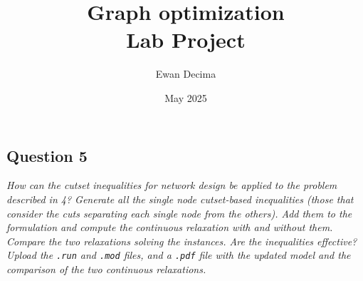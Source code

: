 \documentclass[10pt]{article}
\begin{document}
	\title{Graph optimization \\ Lab Project}
	\author{Ewan Decima}
	\date{May 2025}

	\maketitle

	\tableofcontents
	\newpage

	
	\newpage

	
	\newpage

	
	\newpage

	
	\newpage


    \subsection*{Question 5}
    \textit{How can the cutset inequalities for network design be applied to the problem described in 4? Generate all the single node cutset-based inequalities (those that consider the cuts separating each single node from the others). Add them to the formulation and compute the continuous relaxation with and without them. Compare the two relaxations solving the instances. Are the inequalities effective? Upload the \texttt{.run} and \texttt{.mod} files, and a \texttt{.pdf} file with the updated model and the comparison of the two continuous relaxations.}
	\newpage

	
	\newpage
\end{document}
